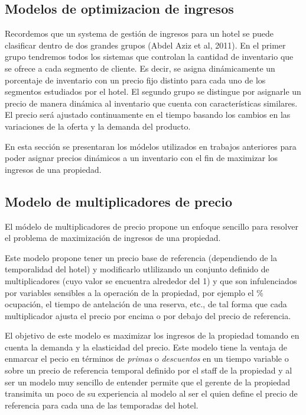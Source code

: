 {\subsection*{Modelos de optimizacion de ingresos}

Recordemos que un systema de gestión de ingresos para un hotel se puede clasificar dentro de dos grandes grupos (Abdel Aziz et al, 2011). En el primer grupo tendremos todos los sistemas que controlan la cantidad de inventario que se ofrece a cada segmento de cliente. Es decir, se asigna dinámicamente un porcentaje de inventario con un precio fijo distinto para cada uno de los segmentos estudiados por el hotel. El segundo grupo se distingue por asignarle un precio de manera dinámica al inventario que cuenta con características similares. El precio será ajustado continuamente en el tiempo basando los cambios en las variaciones de la oferta y la demanda del producto.

En esta sección se presentaran los módelos utilizados en trabajos anteriores para poder asignar precios dinámicos a un inventario con el fin de maximizar los ingresos de una propiedad.

\subsection*{Modelo de multiplicadores de precio}

El módelo de multiplicadores de precio propone un enfoque sencillo para resolver el problema de maximización de ingresos de una propiedad.

Este modelo propone tener un precio base de referencia (dependiendo de la temporalidad del hotel) y modificarlo utlilizando un conjunto definido de multiplicadores (cuyo valor se encuentra alrededor del 1) y que son infulenciados por variables sensibles a la operación de la propiedad, por ejemplo el \% ocupación, el tiempo de antelación de una reserva, etc., de tal forma que cada multiplicador ajusta el precio por encima o por debajo del precio de referencia. 

El objetivo de este modelo es maximizar los ingresos de la propiedad tomando en cuenta la demanda y la elasticidad del precio. Este modelo tiene la ventaja de enmarcar el pecio en términos de \emph{primas} o \emph{descuentos} en un tiempo variable o sobre un precio de referencia temporal definido por el staff de la propiedad y al ser un modelo muy sencillo de entender permite que el gerente de la propiedad transimita un poco de su experiencia al modelo al ser el quien define el precio de referencia para cada una de las temporadas del hotel.

}
